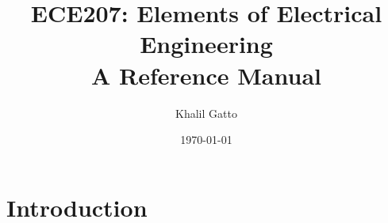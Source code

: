 \documentclass{article}
\title{ECE207: Elements of Electrical Engineering\\A Reference Manual}
\author{Khalil Gatto}
\date{\today}
\begin{document}
\maketitle

\section{Introduction}
\end{document}
